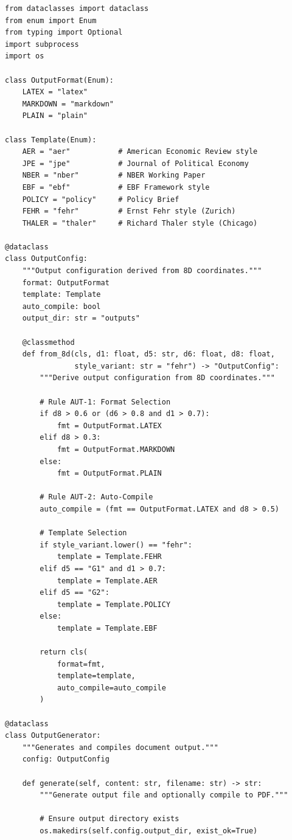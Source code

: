 \begin{verbatim}
from dataclasses import dataclass
from enum import Enum
from typing import Optional
import subprocess
import os

class OutputFormat(Enum):
    LATEX = "latex"
    MARKDOWN = "markdown"
    PLAIN = "plain"

class Template(Enum):
    AER = "aer"           # American Economic Review style
    JPE = "jpe"           # Journal of Political Economy
    NBER = "nber"         # NBER Working Paper
    EBF = "ebf"           # EBF Framework style
    POLICY = "policy"     # Policy Brief
    FEHR = "fehr"         # Ernst Fehr style (Zurich)
    THALER = "thaler"     # Richard Thaler style (Chicago)

@dataclass
class OutputConfig:
    """Output configuration derived from 8D coordinates."""
    format: OutputFormat
    template: Template
    auto_compile: bool
    output_dir: str = "outputs"

    @classmethod
    def from_8d(cls, d1: float, d5: str, d6: float, d8: float,
                style_variant: str = "fehr") -> "OutputConfig":
        """Derive output configuration from 8D coordinates."""

        # Rule AUT-1: Format Selection
        if d8 > 0.6 or (d6 > 0.8 and d1 > 0.7):
            fmt = OutputFormat.LATEX
        elif d8 > 0.3:
            fmt = OutputFormat.MARKDOWN
        else:
            fmt = OutputFormat.PLAIN

        # Rule AUT-2: Auto-Compile
        auto_compile = (fmt == OutputFormat.LATEX and d8 > 0.5)

        # Template Selection
        if style_variant.lower() == "fehr":
            template = Template.FEHR
        elif d5 == "G1" and d1 > 0.7:
            template = Template.AER
        elif d5 == "G2":
            template = Template.POLICY
        else:
            template = Template.EBF

        return cls(
            format=fmt,
            template=template,
            auto_compile=auto_compile
        )

@dataclass
class OutputGenerator:
    """Generates and compiles document output."""
    config: OutputConfig

    def generate(self, content: str, filename: str) -> str:
        """Generate output file and optionally compile to PDF."""

        # Ensure output directory exists
        os.makedirs(self.config.output_dir, exist_ok=True)


\end{verbatim}
